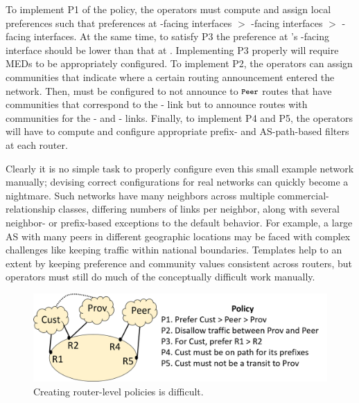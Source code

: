 To implement P1 of the policy, the operators must compute and assign
local preferences such that preferences at -facing interfaces
$>$ -facing interfaces $>$ -facing interfaces. At
the same time, to satisfy P3 the preference at 's
-facing interface should be lower than that at
. Implementing P3 properly will require MEDs to be appropriately configured. 
To implement P2, the operators can assign communities that
indicate where a certain routing announcement entered the
network. Then,  must be configured to not announce to
$\CD{Peer}$ routes that have communities that correspond to the
- link but to announce routes with communities for the - and - links. Finally, to implement P4 and P5, the operators will have to compute and configure appropriate prefix- and AS-path-based filters at each router.

Clearly it is no simple task to properly configure even this
small example network manually; devising correct configurations for real networks can quickly become a nightmare. Such networks have many neighbors across multiple commercial-relationship classes, differing numbers of links per neighbor, along with several neighbor- or prefix-based exceptions to the default behavior. For example, a large AS with many peers in different geographic locations may be faced with complex challenges like keeping traffic within national boundaries.
Templates help to an extent by keeping preference and community values consistent across routers, but operators must still do much of the conceptually difficult work manually. 


\begin{figure}[t!]
  \centering
  \includegraphics[width=\columnwidth]{figures/example1}
  \caption{Creating router-level policies is difficult.}
  \label{fig:example1}
  \vspace{-1em}
\end{figure}


